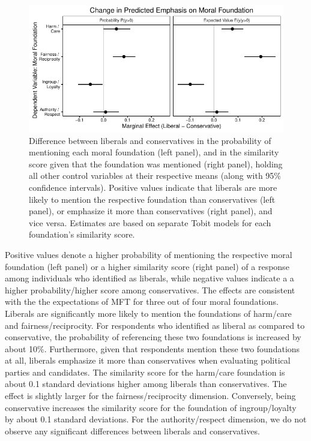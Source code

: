 \documentclass[12pt]{article}
\begin{document}
\begin{figure}[ht]\centering
\includegraphics{../calc/fig/tobit_ideol.pdf}
\caption{Difference between liberals and conservatives in the probability of mentioning each moral foundation (left panel), and in the similarity score given that the foundation was mentioned (right panel), holding all other control variables at their respective means (along with 95\% confidence intervals). Positive values indicate that liberals are more likely to mention the respective foundation than conservatives (left panel), or emphasize it more than conservatives (right panel), and vice versa. Estimates are based on separate Tobit models for each foundation's similarity score. %
}\label{fig:tobit_ideol}
\end{figure}

Positive values denote a higher probability of mentioning the respective moral foundation (left panel) or a higher similarity score (right panel) of a response among individuals who identified as liberals, while negative values indicate a a higher probability/higher score among conservatives. The effects are consistent with the the expectations of MFT for three out of four moral foundations. Liberals are significantly more likely to mention the foundations of harm/care and fairness/reciprocity. For respondents who identified as liberal as compared to conservative, the probability of referencing these two foundations is increased by about 10\%. Furthermore, given that respondents mention these two foundations at all, liberals emphasize it more than conservatives when evaluating political parties and candidates. The similarity score for the harm/care foundation is about 0.1 standard deviations higher among liberals than conservatives. The effect is slightly larger for the fairness/reciprocity dimension. Conversely, being conservative increases the similarity score for the foundation of ingroup/loyalty by about 0.1 standard deviations. For the authority/respect dimension, we do not observe any significant differences between liberals and conservatives.
\end{document}

